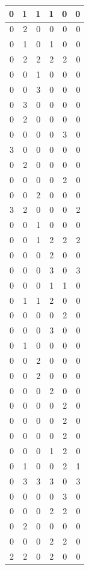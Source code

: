 \documentclass[
]{article}
\begin{document}
\begin{tabular}{r|r|r|r|r|r}
\hline
0 & 1 & 1 & 1 & 0 & 0\\
\hline
0 & 2 & 0 & 0 & 0 & 0\\
\hline
0 & 1 & 0 & 1 & 0 & 0\\
\hline
0 & 2 & 2 & 2 & 2 & 0\\
\hline
0 & 0 & 1 & 0 & 0 & 0\\
\hline
0 & 0 & 3 & 0 & 0 & 0\\
\hline
0 & 3 & 0 & 0 & 0 & 0\\
\hline
0 & 2 & 0 & 0 & 0 & 0\\
\hline
0 & 0 & 0 & 0 & 3 & 0\\
\hline
3 & 0 & 0 & 0 & 0 & 0\\
\hline
0 & 2 & 0 & 0 & 0 & 0\\
\hline
0 & 0 & 0 & 0 & 2 & 0\\
\hline
0 & 0 & 2 & 0 & 0 & 0\\
\hline
3 & 2 & 0 & 0 & 0 & 2\\
\hline
0 & 0 & 1 & 0 & 0 & 0\\
\hline
0 & 0 & 1 & 2 & 2 & 2\\
\hline
0 & 0 & 0 & 2 & 0 & 0\\
\hline
0 & 0 & 0 & 3 & 0 & 3\\
\hline
0 & 0 & 0 & 1 & 1 & 0\\
\hline
0 & 1 & 1 & 2 & 0 & 0\\
\hline
0 & 0 & 0 & 0 & 2 & 0\\
\hline
0 & 0 & 0 & 3 & 0 & 0\\
\hline
0 & 1 & 0 & 0 & 0 & 0\\
\hline
0 & 0 & 2 & 0 & 0 & 0\\
\hline
0 & 0 & 2 & 0 & 0 & 0\\
\hline
0 & 0 & 0 & 2 & 0 & 0\\
\hline
0 & 0 & 0 & 0 & 2 & 0\\
\hline
0 & 0 & 0 & 0 & 2 & 0\\
\hline
0 & 0 & 0 & 0 & 2 & 0\\
\hline
0 & 0 & 0 & 1 & 2 & 0\\
\hline
0 & 1 & 0 & 0 & 2 & 1\\
\hline
0 & 3 & 3 & 3 & 0 & 3\\
\hline
0 & 0 & 0 & 0 & 3 & 0\\
\hline
0 & 0 & 0 & 2 & 2 & 0\\
\hline
0 & 2 & 0 & 0 & 0 & 0\\
\hline
0 & 0 & 0 & 2 & 2 & 0\\
\hline
2 & 2 & 0 & 2 & 0 & 0\\

\end{tabular}
\end{document}
